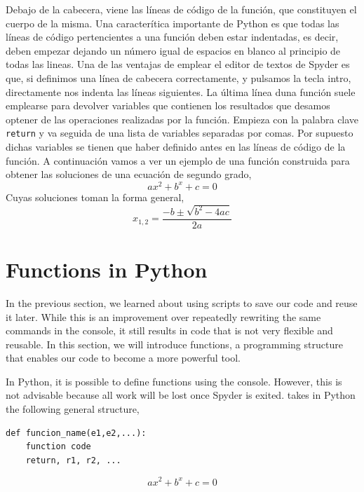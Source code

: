 \begin{paracol}{2}
Debajo de la cabecera, viene las líneas de código de la función, que constituyen el cuerpo de la misma. Una caracterítica importante de Python es que todas las líneas de código pertencientes a una función deben estar indentadas, es decir, deben empezar dejando un número igual de espacios en blanco al principio de todas las lineas. Una de las ventajas de emplear el editor de textos de Spyder es que, si definimos una línea de cabecera correctamente,  y pulsamos la tecla intro, directamente nos indenta las líneas siguientes. La última línea duna función suele emplearse para devolver variables que contienen los resultados que desamos optener de las operaciones realizadas por la función. Empieza con la palabra clave \texttt{return} y va seguida de una lista de variables separadas por comas. Por supuesto dichas variables se tienen que haber definido antes en las líneas de código de la función. A continuación vamos a ver un ejemplo de una función construida para obtener las soluciones de una ecuación de segundo grado,
\begin{equation*}
    ax^2+b^x+c = 0
\end{equation*}
Cuyas soluciones toman la forma general,
\begin{equation*}
    x_{1,2} = \frac{-b\pm \sqrt{b^2-4ac}}{2a}
\end{equation*}
\switchcolumn
\section{Functions in Python} 
In the previous section, we learned about using scripts to save our code and reuse it later. While this is an improvement over repeatedly rewriting the same commands in the console, it still results in code that is not very flexible and reusable. In this section, we will introduce functions, a programming structure that enables our code to become a more powerful tool.

In Python, it is possible to define functions using the console. However, this is not advisable because all work will be lost once Spyder is exited. takes in Python the following general structure,

\begin{verbatim}
def funcion_name(e1,e2,...):
    function code
    return, r1, r2, ...
\end{verbatim}
\begin{equation*}
    ax^2+b^x+c = 0
\end{equation*}


\end{paracol}
